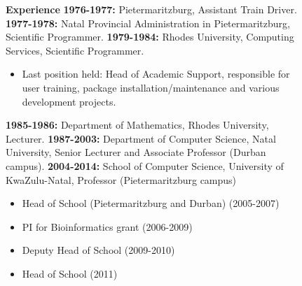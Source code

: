 \begin{description}
\item[] \begin{description}
\item[] {\large \bf Experience}\newline
\newline
{\bf 1976-1977:}
Pietermaritzburg,\newline
Assistant Train Driver. \newline
\newline
{\bf 1977-1978:}
Natal Provincial Administration in Pietermaritzburg, \newline
Scientific Programmer. \newline
 \newline
{\bf 1979-1984:}
Rhodes University, Computing Services, \newline
Scientific Programmer.  
\begin{itemize}
\item Last position held: Head of Academic Support,
           responsible for user training, package installation/maintenance
           and various development projects.
\end{itemize}

{\bf 1985-1986:}
Department of Mathematics, Rhodes University, \newline
Lecturer. \newline
\newline
{\bf 1987-2003:}
Department of Computer Science, Natal University, \newline
Senior Lecturer and Associate Professor (Durban campus). \newline
\newline
{\bf 2004-2014:}
School of Computer Science, University of KwaZulu-Natal,  \newline
Professor (Pietermaritzburg campus)
\begin{itemize}
\item  Head of School (Pietermaritzburg and Durban) (2005-2007)
\item  PI for Bioinformatics grant (2006-2009)
\item  Deputy Head  of School (2009-2010)
\item  Head  of School (2011)
\end{itemize}


\end{description}
\end{description}
